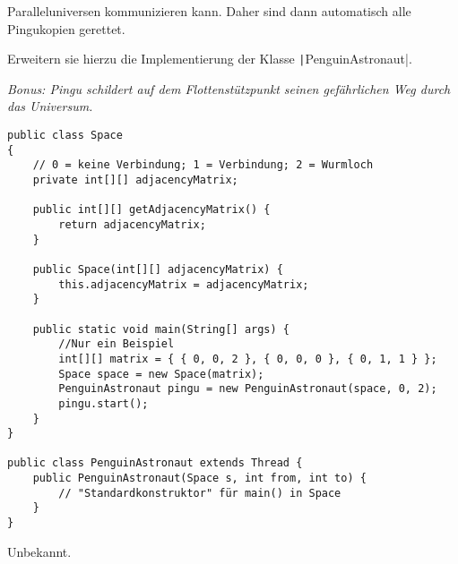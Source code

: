 \documentclass[11pt]{exam} %
\newcommand{\code}[1]{\texttt|#1|}
\begin{document}
\begin{questions}
Paralleluniversen kommunizieren kann. Daher sind dann automatisch alle Pingukopien gerettet.\par
Erweitern sie hierzu die Implementierung der Klasse \code{PenguinAstronaut}.\par
\emph{Bonus: Pingu schildert auf dem Flottenstützpunkt seinen gefährlichen Weg durch das Universum.}\par
\begin{minipage}{\linewidth}
\begin{verbatim}
public class Space
{
	// 0 = keine Verbindung; 1 = Verbindung; 2 = Wurmloch
	private int[][] adjacencyMatrix; 

	public int[][] getAdjacencyMatrix() {
		return adjacencyMatrix;
	}
	
	public Space(int[][] adjacencyMatrix) {
		this.adjacencyMatrix = adjacencyMatrix;
	}
	
	public static void main(String[] args) {
		//Nur ein Beispiel
		int[][] matrix = { { 0, 0, 2 }, { 0, 0, 0 }, { 0, 1, 1 } };
		Space space = new Space(matrix);
		PenguinAstronaut pingu = new PenguinAstronaut(space, 0, 2);
		pingu.start();
	}
}

public class PenguinAstronaut extends Thread {
	public PenguinAstronaut(Space s, int from, int to) {
		// "Standardkonstruktor" für main() in Space
	}
}
\end{verbatim}
\end{minipage}
\begin{solution}
Unbekannt.
\end{solution}
\end{questions}
\end{document}
